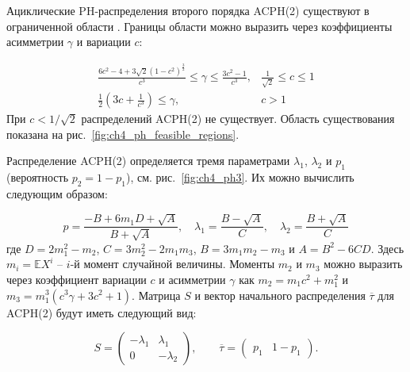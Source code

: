 Ациклические PH-распределения второго порядка ACPH(2) существуют в ограниченной области \cite{Telek2003}. Границы области можно выразить через коэффициенты асимметрии $\gamma$ и вариации $c$:

\begin{equation}
    \label{eq:ch4_acph2_existance}
    \begin{matrix}
        \frac{6c^2 - 4 + 3\sqrt{2}(1 - c^2)^{\frac{3}{2}}}{c^3} \leqslant \gamma \leqslant \frac{3c^2 - 1}{c^3}, & \frac{1}{\sqrt{2}} \leqslant c \leqslant 1\\
        \frac{1}{2}(3c + \frac{1}{c^3}) \leqslant \gamma, & c > 1
    \end{matrix}
\end{equation}
При $c < 1/\sqrt{2}$ распределений ACPH(2) не существует. Область существования показана на рис.~\ref{fig:ch4_ph_feasible_regions}.

Распределение ACPH(2) определяется тремя параметрами $\lambda_1$, $\lambda_2$ и $p_1$ (вероятность $p_2 = 1 - p_1$), см. рис.~\ref{fig:ch4_ph3}. Их можно вычислить следующим  образом:

\begin{equation}
    \label{eq:ch4_acph2_params}
    p = \frac{-B + 6 m_1 D + \sqrt{A}}{B + \sqrt{A}}, \quad
    \lambda_{1} = \frac{B - \sqrt{A}}{C}, \quad
    \lambda_{2} = \frac{B + \sqrt{A}}{C}
\end{equation}
где $D = 2m_1^2 - m_2$, $C = 3 m_2^2 - 2 m_1 m_3$, $B = 3 m_1 m_2 - m_3$ и $A = B^2 - 6 C D$. Здесь $m_i = \mathbb{E}X^i$ -- $i$-й момент случайной величины. Моменты $m_2$ и $m_3$ можно выразить через коэффициент вариации $c$ и асимметрии $\gamma$ как $m_2 = m_1 c^2 + m_1^2$ и $m_3 = m_1^3 (c^3 \gamma + 3 c^2 + 1)$. Матрица $S$ и вектор начального распределения $\overline{\tau}$ для ACPH(2) будут иметь следующий вид:

\begin{equation}
    \label{eq:ch4_acph2_ph_tau}
    S = \left(\begin{matrix}
        -\lambda_1 & \lambda_1 \\
        0 & -\lambda_2
    \end{matrix}\right),
    \qquad
    \overline{\tau} = \left(\begin{matrix}
        p_1 & 1 - p_1
    \end{matrix}\right).
\end{equation}

